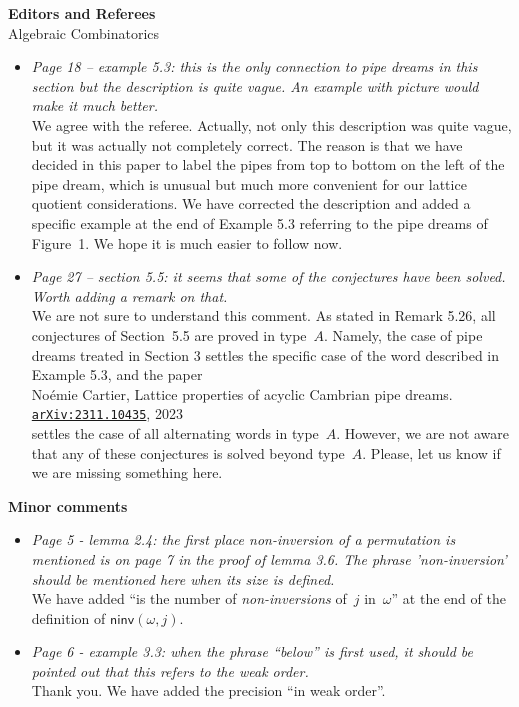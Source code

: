 \documentclass{letter}
\begin{document}
\begin{letter}{{\bf Editors and Referees} \\ Algebraic Combinatorics}
\begin{itemize}
\item \textsl{\color{gray} Page 18 -- example 5.3: this is the only connection to pipe dreams in this section but the description is quite vague. An example with picture would make it much better.} \\
We agree with the referee.
Actually, not only this description was quite vague, but it was actually not completely correct.
The reason is that we have decided in this paper to label the pipes from top to bottom on the left of the pipe dream, which is unusual but much more convenient for our lattice quotient considerations.
We have corrected the description and added a specific example at the end of Example 5.3 referring to the pipe dreams of Figure~1.
We hope it is much easier to follow now.

\item \textsl{\color{gray} Page 27 -- section 5.5: it seems that some of the conjectures have been solved. Worth adding a remark on that.} \\
We are not sure to understand this comment.
As stated in Remark 5.26, all conjectures of Section~5.5 are proved in type~$A$.
Namely, the case of pipe dreams treated in Section 3 settles the specific case of the word described in Example 5.3, and the paper \\[.2cm]
Noémie Cartier, Lattice properties of acyclic Cambrian pipe dreams. \href{http://arxiv.org/abs/2311.10435}{\texttt{arXiv:2311.10435}}, 2023\\[.2cm]
settles the case of all alternating words in type~$A$.
However, we are not aware that any of these conjectures is solved beyond type~$A$.
Please, let us know if we are missing something here.
\end{itemize}

{\bf Minor comments}

\begin{itemize}
\item \textsl{\color{gray} Page 5 - lemma 2.4: the first place non-inversion of a permutation is mentioned is on page 7 in the proof of lemma 3.6. The phrase 'non-inversion' should be mentioned here when its size is defined.} \\
We have added ``is the number of \emph{non-inversions} of~$j$ in~$\omega$'' at the end of the definition of $\mathsf{ninv}(\omega, j)$.

\item \textsl{\color{gray} Page 6 - example 3.3: when the phrase ``below'' is first used, it should be pointed out that this refers to the weak order.} \\
Thank you. We have added the precision ``in weak order''.


\end{itemize}
\end{letter}
\end{document}
